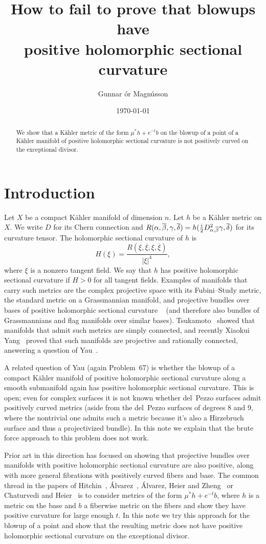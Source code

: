 \documentclass[10pt,a4paper]{amsart}
\author{Gunnar \TH\'or Magn\'usson}
\date{\today}
\title[Failing at blowups]
{How to fail to prove that blowups have\\positive holomorphic sectional curvature}
\def\ov#1{\overline{#1}}
\def\hsc{holomorphic sectional curvature}
\begin{document}
\begin{abstract}
We show that a K\"ahler metric of the form $\mu^*h + e^{-t} b$ on the blowup
of a point of a K\"ahler manifold of positive holomorphic sectional curvature
is not positively curved on the exceptional divisor.
\end{abstract}

\maketitle


\section*{Introduction}

Let $X$ be a compact K\"ahler manifold of dimension $n$.
Let $h$ be a K\"ahler metric on $X$.
We write $D$ for its Chern connection and
$R(\alpha,\ov\beta,\gamma,\ov\delta) = h(\frac i2
D^2_{\smash{\alpha,\ov\beta}}\gamma, \ov\delta)$ for its curvature tensor. The
holomorphic sectional curvature of $h$ is
$$
H(\xi)
= \frac{R(\xi, \ov\xi, \xi, \ov\xi)}{|\xi|^4},
$$
where $\xi$ is a nonzero tangent field.
We say that $h$ has positive holomorphic sectional curvature if $H > 0$ for all
tangent fields.
Examples of manifolds that carry such metrics are the complex projective space
with its Fubini--Study metric, the standard metric on a Grassmannian manifold,
and projective bundles over bases of positive holomorphic sectional curvature
~\cite{alvarez2018projectivized}
(and therefore also bundles of Grassmannians and flag manifolds over similar
bases).
Tsukamoto~\cite{tsukamoto1957kahlerian} showed that manifolds that admit such
metrics are simply connected, and recently Xiaokui Yang~\cite{yang2017rc}
proved that such manifolds are projective and rationally connected, answering a
question of Yau~\cite[Problem~67]{yau1993open}.

A related question of Yau (again Problem~67) is whether the blowup of a compact
K\"ahler manifold of positive \hsc{} along a smooth submanifold again has
positive \hsc.
This is open; even for complex surfaces it is not known whether del~Pezzo
surfaces admit positively curved metrics (aside from the del~Pezzo surfaces of
degrees 8 and 9, where the nontrivial one admits such a metric because it's
also a Hirzebruch surface and thus a projectivized bundle). In this note we
explain that the brute force approach to this problem does not work.

Prior art in this direction has focused on showing that projective bundles
over manifolds with positive \hsc{} are also positive, along with more
general fibrations with positively curved fibers and base.
The common thread in the papers of
Hitchin~\cite{hitchin1975curvature},
\'Alvarez~\cite{alvarez2016positive},
\'Alvarez,
Heier and Zheng~\cite{alvarez2018projectivized} or Chaturvedi and
Heier~\cite{chaturvedi2020hermitian}
is to consider metrics of the form $\mu^* h + e^{-t} b$, where $h$ is a metric
on the base and $b$ a fiberwise metric on the fibers and show they have
positive curvature for large enough $t$.
In this note we try this approach for the blowup of a point and show that
the resulting metric does not have positive \hsc{} on the exceptional divisor.
\end{document}
